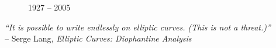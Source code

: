 {\begin{frame}[plain]
\begin{minipage}{0.18\textwidth}
\begin{figure}[h]
	 \par
	{\small 1927 -- 2005}
	\end{figure}
	\end{minipage} \hspace{0.2cm} \begin{minipage}{0.76\textwidth}
	\begin{center} \phantom{.} \par \phantom{.} \par
	{\itshape ``It is possible to write endlessly on elliptic curves. (This is not a threat.)''} \\
	 \phantom{x}\hfill-- Serge Lang, \textit{Elliptic Curves: Diophantine Analysis}
	\end{center}
 	\end{minipage}
\end{frame}
}



\begin{frame}[plain]
\end{frame}



